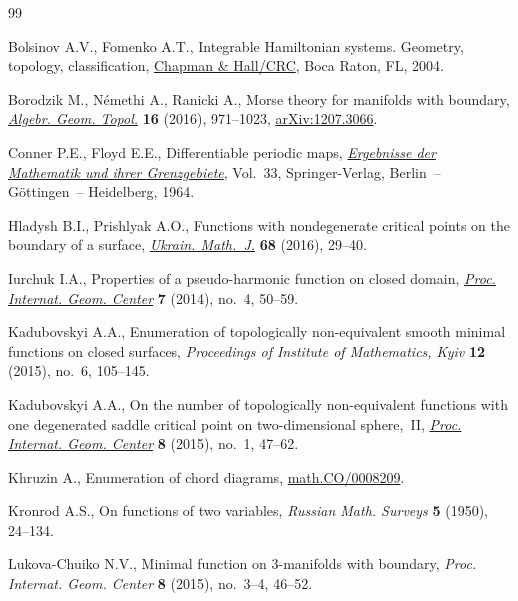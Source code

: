 \documentclass[10pt,a4paper]{amsart}
\numberwithin{equation}{section}
\begin{document}
\begin{thebibliography}{99}
\footnotesize\itemsep=0pt

Bolsinov A.V., Fomenko A.T., Integrable {H}amiltonian systems. Geometry,
 topology, classif\/ication, \href{https://doi.org/10.1201/9780203643426}{Chapman \& Hall/CRC}, Boca Raton, FL, 2004.

Borodzik M., N\'emethi A., Ranicki A., Morse theory for manifolds with
 boundary, \href{https://doi.org/10.2140/agt.2016.16.971}{\textit{Algebr. Geom. Topol.}} \textbf{16} (2016), 971--1023,
 \href{https://arxiv.org/abs/1207.3066}{arXiv:1207.3066}.

Conner P.E., Floyd E.E., Dif\/ferentiable periodic maps, \href{https://doi.org/10.1007/978-3-662-41633-4}{\textit{Ergebnisse der
 Mathematik und ihrer Grenzgebiete}}, Vol.~33, Springer-Verlag, Berlin~--
 G\"ottingen~-- Heidelberg, 1964.

Hladysh B.I., Prishlyak A.O., Functions with nondegenerate critical points on
 the boundary of a surface, \href{https://doi.org/10.1007/s11253-016-1206-5}{\textit{Ukrain. Math.~J.}} \textbf{68} (2016),
 29--40.

Iurchuk I.A., Properties of a pseudo-harmonic function on closed domain,
 \href{https://doi.org/10.15673/2072-9812.4/2014.41445}{\textit{Proc. Internat. Geom. Center}} \textbf{7} (2014), no.~4, 50--59.

Kadubovskyi A.A., Enumeration of topologically non-equivalent smooth minimal
 functions on closed surfaces, \textit{Proceedings of Institute of Mathematics, Kyiv} \textbf{12} (2015), no.~6, 105--145.

Kadubovskyi A.A., On the number of topologically non-equivalent functions with
 one degenerated saddle critical point on two-dimensional sphere,~II,
 \href{https://doi.org/10.15673/2072-9812.1/2015.50155}{\textit{Proc. Internat. Geom. Center}} \textbf{8} (2015), no.~1, 47--62.

Khruzin A., Enumeration of chord diagrams, \href{https://arxiv.org/abs/math.CO/0008209}{math.CO/0008209}.

Kronrod A.S., On functions of two variables, \textit{Russian Math. Surveys}
 \textbf{5} (1950), 24--134.

Lukova-Chuiko N.V., Minimal function on 3-manifolds with boundary,
 \textit{Proc. Internat. Geom. Center} \textbf{8} (2015), no.~3--4, 46--52.


\end{thebibliography}
\end{document}
